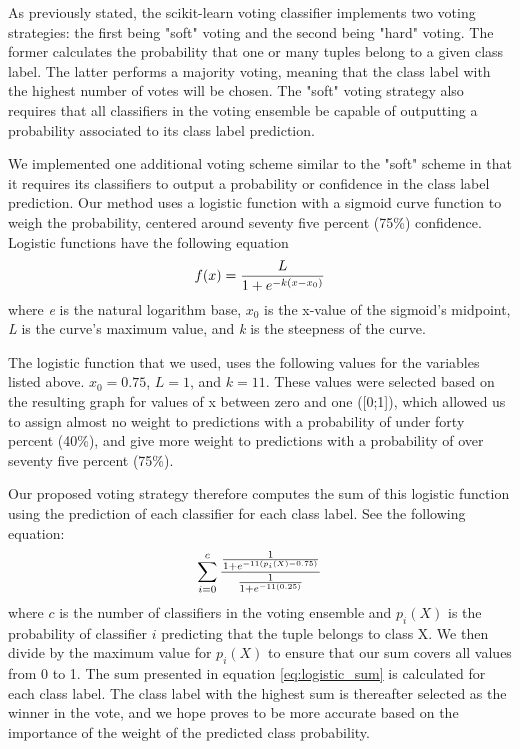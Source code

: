 As previously stated, the scikit-learn voting classifier implements two voting strategies: the first being "soft" voting and the second being "hard" voting. The former calculates the probability that one or many tuples belong to a given class label. The latter performs a majority voting, meaning that the class label with the highest number of votes will be chosen.
The "soft" voting strategy also requires that all classifiers in the voting ensemble be capable of outputting a probability associated to its class label prediction.

We implemented one additional voting scheme similar to the "soft" scheme in that it requires its classifiers to output a probability or confidence in the class label prediction. Our method uses a logistic function with a sigmoid curve function to weigh the probability, centered around seventy five percent (75\%) confidence.
Logistic functions have the following equation
\begin{equation}
    f(x)=\frac{L}{1+e^{-k(x-x_0)}}\\ 
    \label{eq:logistic_function}
\end{equation}
where \textit{e} is the natural logarithm base, \textit{$x_0$} is the x-value of the sigmoid's midpoint, \textit{L} is the curve's maximum value, and \textit{k} is the steepness of the curve.

The logistic function that we used, uses the following values for the variables listed above. $x_0=0.75$, $L=1$, and $k=11$. These values were selected based on the resulting graph for values of x between zero and one ([0;1]), which allowed us to assign almost no weight to predictions with a probability of under forty percent (40\%), and give more weight to predictions with a probability of over seventy five percent (75\%).

Our proposed voting strategy therefore computes the sum of this logistic function using the prediction of each classifier for each class label. See the following equation:
\begin{equation}
    \sum_{i=0}^{c} \frac{\frac{1}{1+e^{-11(p_i(X)-0.75)}}}{\frac{1}{1+e^{-11(0.25)}}}\\ 
    \label{eq:logistic_sum}
\end{equation}
where $c$ is the number of classifiers in the voting ensemble and $p_i(X)$ is the probability of classifier $i$ predicting that the tuple belongs to class X. We then divide by the maximum value for $p_i(X)$ to ensure that our sum covers all values from 0 to 1.
The sum presented in equation \ref{eq:logistic_sum} is calculated for each class label. The class label with the highest sum is thereafter selected as the winner in the vote, and we hope proves to be more accurate based on the importance of the weight of the predicted class probability.

